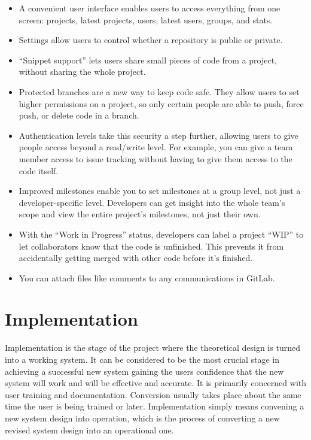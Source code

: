	\begin{itemize}
		\item A convenient user interface enables users to access everything from one screen: projects, latest projects, users, latest users, groups, and stats.
		\item Settings allow users to control whether a repository is public or private.
		\item “Snippet support” lets users share small pieces of code from a project, without sharing the whole project.
		\item Protected branches are a new way to keep code safe. They allow users to set higher permissions on a project, so only certain people are able to push, force push, or delete code in a branch.
		\item Authentication levels take this security a step further, allowing users to give people access beyond a read/write level. For example, you can give a team member access to issue tracking without having to give them access to the code itself.
		\item Improved milestones enable you to set milestones at a group level, not just a developer-specific level. Developers can get insight into the whole team’s scope and view the entire project’s milestones, not just their own.
		\item With the “Work in Progress” status, developers can label a project “WIP” to let collaborators know that the code is unfinished. This prevents it from accidentally getting merged with other code before it’s finished.
		\item You can attach files like comments to any communications in GitLab.
	
\end{itemize}


\section{Implementation}
Implementation is the stage of the project where the theoretical design is turned into a working system. It can be considered to be the most crucial stage in achieving a successful new system gaining the users confidence that the new system will work and will be effective and accurate. It is primarily concerned with user training and documentation. Conversion usually takes place about the same time the user is being trained or later. Implementation simply means convening a new system design into operation, which is the process of converting a new revised system design into an operational one.

